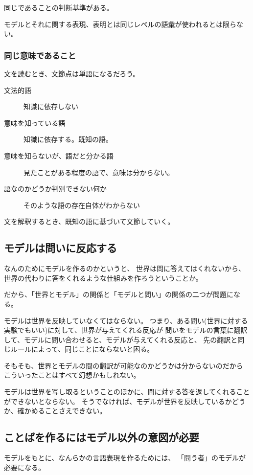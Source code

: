 \documentclass[10pt, oneside]{jarticle}   	%
\begin{document}
同じであることの判断基準がある。

モデルとそれに関する表現、表明とは同じレベルの語彙が使われるとは限らない。

\subsubsection{同じ意味であること}
文を読むとき、文節点は単語になるだろう。

\begin{description}
\item[文法的語 ] 知識に依存しない
\item[意味を知っている語] 知識に依存する。既知の語。
\item[意味を知らないが、語だと分かる語] 見たことがある程度の語で、意味は分からない。 
\item[語なのかどうか判別できない何か] そのような語の存在自体がわからない
\end{description}

文を解釈するとき、既知の語に基づいて文節していく。



\subsection{モデルは問いに反応する}
なんのためにモデルを作るのかというと、
世界は問に答えてはくれないから、
世界の代わりに答をくれるような仕組みを作ろうということか。

だから、「世界とモデル」の関係と「モデルと問い」の関係の二つが問題になる。

モデルは世界を反映していなくてはならない。
つまり、ある問い(世界に対する実験でもいい)に対して、世界が与えてくれる反応が
問いをモデルの言葉に翻訳して、モデルに問い合わせると、モデルが与えてくれる反応と、
先の翻訳と同じルールによって、同じことにならないと困る。

そもそも、世界とモデルの間の翻訳が可能なのかどうかは分からないのだから
こういったことはすべて幻想かもしれない。

モデルは世界を写し取るということのほかに、問に対する答を返してくれることができないとならない。
そうでなければ、モデルが世界を反映しているかどうか、確かめることさえできない。

\subsection{ことばを作るにはモデル以外の意図が必要}
モデルをもとに、なんらかの言語表現を作るためには、
「問う者」のモデルが必要になる。
\end{document}
